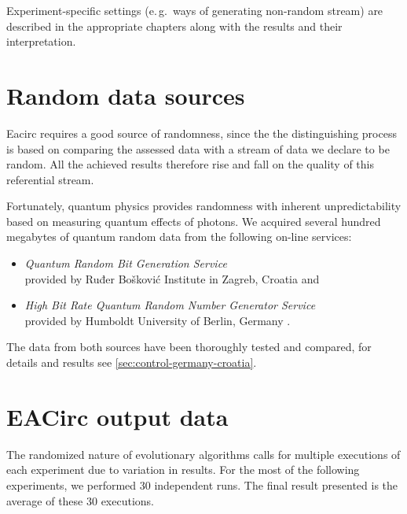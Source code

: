 \documentclass[12pt,oneside]{fithesis2}
\newcommand{\squarebullet}{\textcolor{black}{\raisebox{0.15em}{\rule{4pt}{4pt}}}}
\newenvironment{myItemize}{
  \begin{itemize}[leftmargin=2em,rightmargin=1em,itemsep=\parskip ,parsep=0em,topsep=0em,partopsep=0em]
  \renewcommand{\labelitemi}{\squarebullet}
  \renewcommand{\labelitemii}{$\diamond$}
}{
  \end{itemize}
}
\begin{document}
Experiment-specific settings (e.\,g.\ ways of generating non-random stream) are described in the 
appropriate chapters along with the results and their interpretation.

\section{Random data sources}
\label{sec:settings-random}

Eacirc requires a good source of randomness, since the the distinguishing process is based on comparing the assessed data
with a stream of data we declare to be random. All the achieved results therefore rise and fall 
on the quality of this referential stream.

Fortunately, quantum physics provides randomness with inherent unpredictability based on measuring quantum effects of photons. 
We acquired several hundred megabytes of quantum random data from the following on-line services:
\begin{myItemize}
\item \textit{Quantum Random Bit Generation Service}\\
provided by Ruđer Bošković Institute in Zagreb, Croatia \parencite{qrng-service-croatia} and
\item \textit{High Bit Rate Quantum Random Number Generator Service}\\
provided by Humboldt University of Berlin, Germany \parencite{qrng-service-germany}.
\end{myItemize}
The data from both sources have been thoroughly tested and compared, for details and results 
see \autoref{sec:control-germany-croatia}.

\section{EACirc output data}
\label{sec:settings-eacirc-output}

The randomized nature of evolutionary algorithms calls for multiple executions of each experiment due to variation in results.
For the most of the following experiments, we performed 30 independent runs. The final result presented is the average
of these 30 executions.
\end{document}
